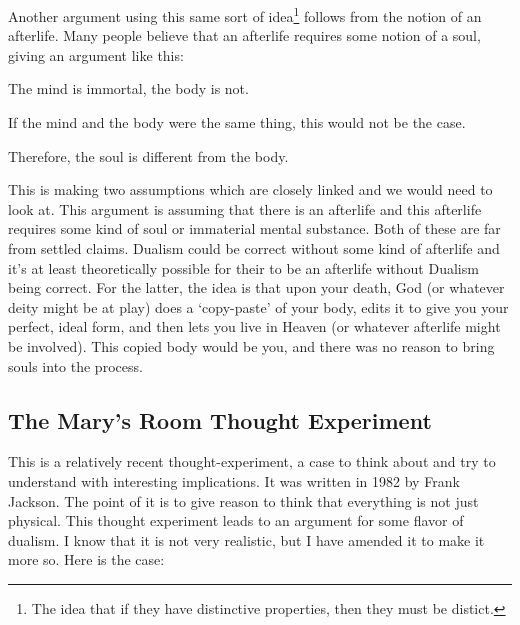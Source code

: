 Another argument using this same sort of idea\footnote{The idea that if they have distinctive properties, then they must be distict.} follows from the notion of an afterlife. Many people believe that an afterlife requires some notion of a soul, giving an argument like this: 

\begin{earg}
    \item[1 ] The mind is immortal, the body is not.
    \item[2 ] If the mind and the body were the same thing, this would not be the case.
    \item[3 ] Therefore, the soul is different from the body.
\end{earg}

This is making two assumptions which are closely linked and we would need to look at. This argument is assuming that there is an afterlife and this afterlife requires some kind of soul or immaterial mental substance. Both of these are far from settled claims. Dualism could be correct without some kind of afterlife and it's at least theoretically possible for their to be an afterlife without Dualism being correct. For the latter, the idea is that upon your death, God (or whatever deity might be at play) does a `copy-paste' of your body, edits it to give you your perfect, ideal form, and then lets you live in Heaven (or whatever afterlife might be involved). This copied body would be you, and there was no reason to bring souls into the process.  

\subsection{The Mary's Room Thought Experiment}

This is a relatively recent thought-experiment, a case to think about and try to understand with interesting implications. It was written in 1982 by Frank Jackson.\autocite{Jackson1982} The point of it is to give reason to think that everything is not just physical. This thought experiment leads to an argument for some flavor of dualism. I know that it is not very realistic, but I have amended it to make it more so. Here is the case:

